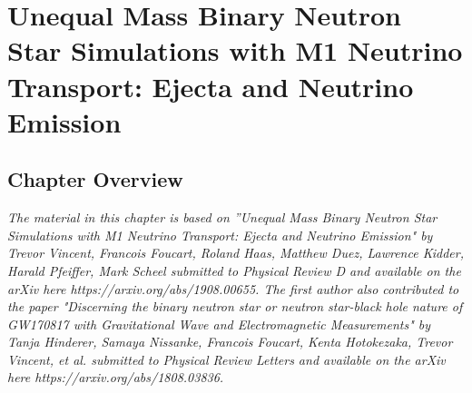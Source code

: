 \chapter{Unequal Mass Binary Neutron Star Simulations with M1 Neutrino Transport: Ejecta and Neutrino Emission}


\section{Chapter Overview}

\textit{The material in this chapter is based on ”Unequal Mass Binary Neutron Star Simulations with M1 Neutrino Transport: Ejecta and Neutrino Emission" by Trevor Vincent, Francois Foucart, Roland Haas, Matthew Duez, Lawrence Kidder, Harald Pfeiffer, Mark Scheel submitted to Physical Review D and available on the arXiv here https://arxiv.org/abs/1908.00655. The first author also contributed to the paper "Discerning the binary neutron star or neutron star-black hole nature of GW170817 with Gravitational Wave and Electromagnetic Measurements" by Tanja Hinderer, Samaya Nissanke, Francois Foucart, Kenta Hotokezaka, Trevor Vincent, et al. submitted to Physical Review Letters and available on the arXiv here https://arxiv.org/abs/1808.03836.}

